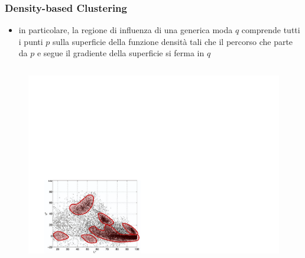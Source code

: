 \begin{frame}

	\frametitle{{\color{GradientDescentDiagramRed}Density-based Clustering}}

		\begin{itemize}
			\item in particolare, la regione di influenza di una generica moda $q$ comprende tutti i punti $p$ sulla superficie della funzione densità tali che il percorso che parte da $p$ e segue il gradiente della superficie si ferma in $q$
		\end{itemize}

		\begin{columns}

			\begin{figure}[!htbp]
				\centering
				\includegraphics[width=0.85\linewidth]{images/unsupervised/non_parametric/density_red.pdf}
			\end{figure}


\end{columns}
\end{frame}
